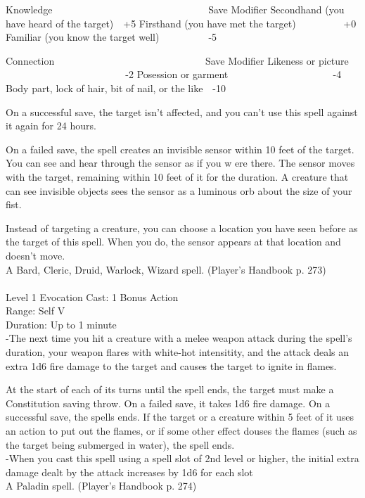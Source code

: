 \documentclass[10pt,twocolumn]{report}
\begin{document}
Knowledge                 Save Modifier
Secondhand (you have heard of the target) +5
Firsthand (you have met the target)      +0
Familiar (you know the target well)     -5

Connection                Save Modifier
Likeness or picture               -2
Posession or garment            -4
Body part, lock of hair, bit of nail, or the like -10

On a successful save, the target isn’t affected, and you can’t use this spell against it again for 24 hours.

On a failed save, the spell creates an invisible sensor within 10 feet of the target. You can see and hear through the sensor as if you w ere there. The sensor moves with the target, remaining within 10 feet of it for the duration. A creature that can see invisible objects sees the sensor as a luminous orb about the size of your fist.

Instead of targeting a creature, you can choose a location you have seen before as the target of this spell. When you do, the sensor appears at that location and doesn’t move.\\
A Bard, Cleric, Druid, Warlock, Wizard spell. (Player's Handbook p. 273) \\


 \\
Level 1 \quad Evocation \quad Cast: 1 Bonus Action\\
Range: Self \quad V\\
Duration: Up to 1 minute \quad \\
-The next time you hit a creature with a melee weapon attack during the spell’s duration, your weapon flares with white-hot intensitity, and the attack deals an extra 1d6 fire damage to the target and causes the target to ignite in flames.

At the start of each of its turns until the spell ends, the target must make a Constitution saving throw. On a failed save, it takes 1d6 fire damage. On a successful save, the spells ends. If the target or a creature within 5 feet of it uses an action to put out the flames, or if some other effect douses the flames (such as the target being submerged in water), the spell ends.\\
-When you cast this spell using a spell slot of 2nd level or higher, the initial extra damage dealt by the attack increases by 1d6 for each slot\\
A Paladin spell. (Player's Handbook p. 274) \\
\end{document}
